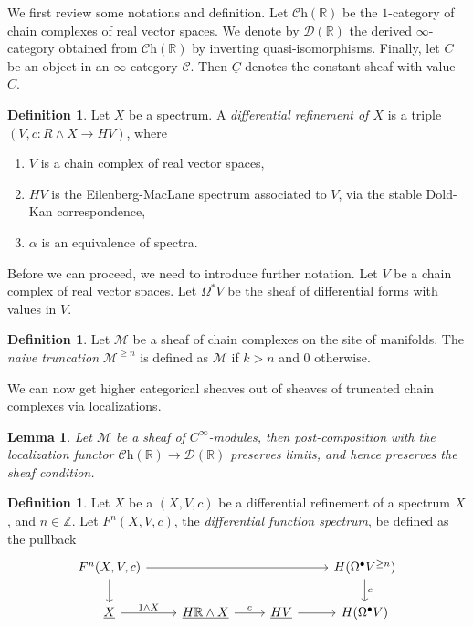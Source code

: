 \documentclass[a4paper]{book}
\newcommand{\lC}{\mathcal{C}}
\newcommand{\lD}{\mathcal{D}}
\newcommand{\lM}{\mathcal{M}}
\newcommand{\bR}{\mathbb{R}}
\newcommand{\bZ}{\mathbb{Z}}
\newcommand{\Ch}{\lC\mathrm{h}} %
\newtheorem{lemma}[equation]{Lemma}
\theoremstyle{definition}
\newtheorem{definition}[equation]{Definition}
\theoremstyle{remark}
\numberwithin{equation}{section}
\begin{document}
We first review some notations and definition. Let $\Ch(\bR)$ be the $1$-category of chain complexes of real vector spaces. We denote by $\lD(\bR)$ the derived $\infty$-category obtained from $\Ch(\bR)$ by inverting quasi-isomorphisms. Finally, let $C$ be an object in an $\infty$-category $\lC$. Then $\underline{C}$ denotes the constant sheaf with value $C$.

\begin{definition}
  Let $X$ be a spectrum. A \emph{differential refinement of $X$} is a triple $(V, c\colon R \wedge X \to HV)$, where 
  \begin{enumerate}
    \item $V$ is a chain complex of real vector spaces,
    \item $HV$ is the Eilenberg-MacLane spectrum associated to $V$, via the stable Dold-Kan correspondence,
    \item $\alpha$ is an equivalence of spectra.
  \end{enumerate}
\end{definition}

Before we can proceed, we need to introduce further notation. Let $V$ be a chain complex of real vector spaces. Let $\Omega^*V$ be the sheaf of differential forms with values in $V$. 

\begin{definition}
 Let $\lM$ be a sheaf of chain complexes on the site of manifolds. The \emph{naive truncation} $\lM^{\geq n}$ is defined as $\lM$ if $k > n$ and $0$ otherwise.
\end{definition}

We can now get higher categorical sheaves out of sheaves of truncated chain complexes via localizations.

\begin{lemma}
  Let $\lM$ be a sheaf of $C^\infty$-modules, then post-composition with the localization functor $\Ch(\bR) \to \lD(\bR)$ preserves limits, and hence preserves the sheaf condition.
\end{lemma}

\begin{definition}
  Let $X$ be a $(X,V,c)$ be a differential refinement of a spectrum $X$, and $n \in \bZ$. Let $F^n(X,V,c)$, the \emph{differential function spectrum}, be defined as the pullback
  \[
  \begin{tikzcd}
    F^n(X,V,c) \arrow[rrr] \arrow[d] & & & H(\Omega^\bullet V^{\geq n}) \arrow[d, "c"] \\
    \underline{X} \arrow[r, "1 \wedge X"] & \underline{H\bR \wedge X} \arrow[r, "c"] &  \underline{HV} \arrow[r] & H(\Omega^\bullet V)
  \end{tikzcd}
  \]   
\end{definition}
\end{document}

